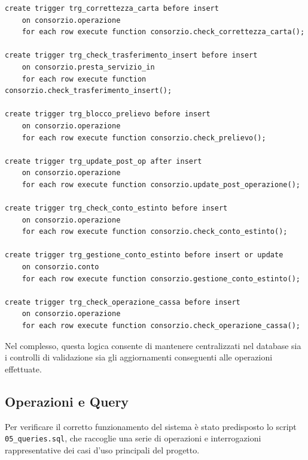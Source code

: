 \begin{lstlisting}[caption={Definizione dei trigger principali}]
create trigger trg_correttezza_carta before insert
    on consorzio.operazione
    for each row execute function consorzio.check_correttezza_carta();

create trigger trg_check_trasferimento_insert before insert
    on consorzio.presta_servizio_in
    for each row execute function consorzio.check_trasferimento_insert();

create trigger trg_blocco_prelievo before insert
    on consorzio.operazione
    for each row execute function consorzio.check_prelievo();

create trigger trg_update_post_op after insert
    on consorzio.operazione
    for each row execute function consorzio.update_post_operazione();

create trigger trg_check_conto_estinto before insert
    on consorzio.operazione
    for each row execute function consorzio.check_conto_estinto();

create trigger trg_gestione_conto_estinto before insert or update
    on consorzio.conto
    for each row execute function consorzio.gestione_conto_estinto();

create trigger trg_check_operazione_cassa before insert
    on consorzio.operazione 
    for each row execute function consorzio.check_operazione_cassa();
\end{lstlisting}

Nel complesso, questa logica consente di mantenere centralizzati nel database sia i controlli di validazione sia gli aggiornamenti conseguenti alle operazioni effettuate.

\subsection{Operazioni e Query}
Per verificare il corretto funzionamento del sistema è stato predisposto lo script \texttt{05\_queries.sql}, che raccoglie una serie di operazioni e interrogazioni rappresentative dei casi d'uso principali del progetto.

